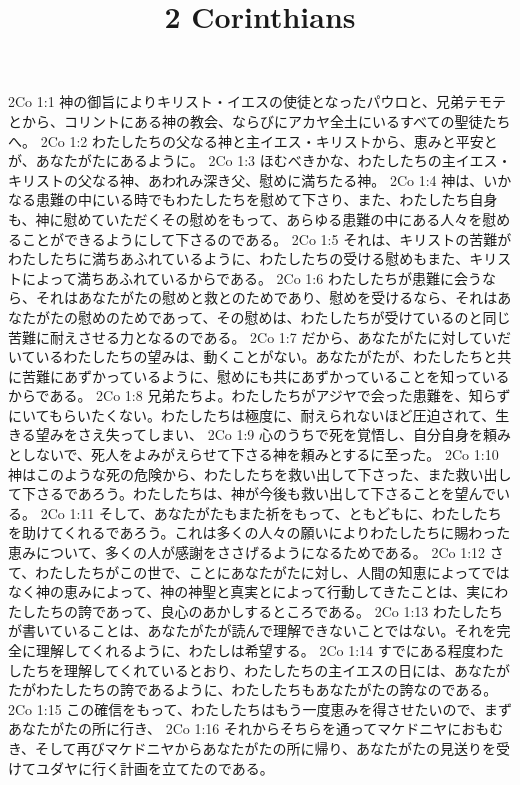 

\title{2 Corinthians}

2Co 1:1  神の御旨によりキリスト・イエスの使徒となったパウロと、兄弟テモテとから、コリントにある神の教会、ならびにアカヤ全土にいるすべての聖徒たちへ。
2Co 1:2  わたしたちの父なる神と主イエス・キリストから、恵みと平安とが、あなたがたにあるように。
2Co 1:3  ほむべきかな、わたしたちの主イエス・キリストの父なる神、あわれみ深き父、慰めに満ちたる神。
2Co 1:4  神は、いかなる患難の中にいる時でもわたしたちを慰めて下さり、また、わたしたち自身も、神に慰めていただくその慰めをもって、あらゆる患難の中にある人々を慰めることができるようにして下さるのである。
2Co 1:5  それは、キリストの苦難がわたしたちに満ちあふれているように、わたしたちの受ける慰めもまた、キリストによって満ちあふれているからである。
2Co 1:6  わたしたちが患難に会うなら、それはあなたがたの慰めと救とのためであり、慰めを受けるなら、それはあなたがたの慰めのためであって、その慰めは、わたしたちが受けているのと同じ苦難に耐えさせる力となるのである。
2Co 1:7  だから、あなたがたに対していだいているわたしたちの望みは、動くことがない。あなたがたが、わたしたちと共に苦難にあずかっているように、慰めにも共にあずかっていることを知っているからである。
2Co 1:8  兄弟たちよ。わたしたちがアジヤで会った患難を、知らずにいてもらいたくない。わたしたちは極度に、耐えられないほど圧迫されて、生きる望みをさえ失ってしまい、
2Co 1:9  心のうちで死を覚悟し、自分自身を頼みとしないで、死人をよみがえらせて下さる神を頼みとするに至った。
2Co 1:10  神はこのような死の危険から、わたしたちを救い出して下さった、また救い出して下さるであろう。わたしたちは、神が今後も救い出して下さることを望んでいる。
2Co 1:11  そして、あなたがたもまた祈をもって、ともどもに、わたしたちを助けてくれるであろう。これは多くの人々の願いによりわたしたちに賜わった恵みについて、多くの人が感謝をささげるようになるためである。
2Co 1:12  さて、わたしたちがこの世で、ことにあなたがたに対し、人間の知恵によってではなく神の恵みによって、神の神聖と真実とによって行動してきたことは、実にわたしたちの誇であって、良心のあかしするところである。
2Co 1:13  わたしたちが書いていることは、あなたがたが読んで理解できないことではない。それを完全に理解してくれるように、わたしは希望する。
2Co 1:14  すでにある程度わたしたちを理解してくれているとおり、わたしたちの主イエスの日には、あなたがたがわたしたちの誇であるように、わたしたちもあなたがたの誇なのである。
2Co 1:15  この確信をもって、わたしたちはもう一度恵みを得させたいので、まずあなたがたの所に行き、
2Co 1:16  それからそちらを通ってマケドニヤにおもむき、そして再びマケドニヤからあなたがたの所に帰り、あなたがたの見送りを受けてユダヤに行く計画を立てたのである。
